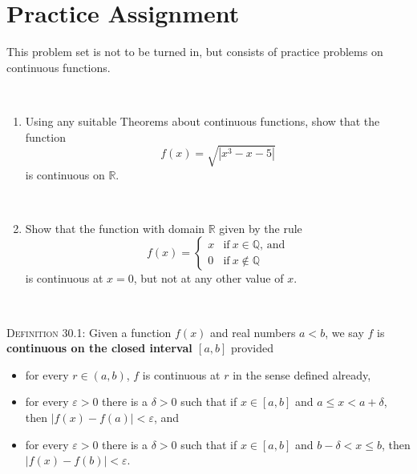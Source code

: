\documentclass[12pt]{amsart}
\newcommand{\Q}{\mathbb{Q}}
\newcommand{\R}{\mathbb{R}}
\newcommand{\e}{\varepsilon}
\newcommand{\showsol}[1]{\def\displaysol{#1}}
\begin{document}
\showsol{1}
	
	\thispagestyle{empty}
	
	\section*{Practice Assignment}
	
	This problem set is not to be turned in, but consists of practice problems on continuous functions.
	
	\
	
	

\begin{enumerate}
\item Using any suitable Theorems about continuous functions, show that the function 
\[\displaystyle f(x)= \sqrt{ | x^3 - x -5 |}\] is continuous on $\R$.

\

\item Show that the function with domain $\R$ given by the rule
\[ f(x) = \begin{cases} x & \text{if} \ x\in \Q, \, \text{and}\\
0 & \text{if} \ x\notin \Q\end{cases}\]
is continuous at $x=0$, but not at any other value of $x$.

\end{enumerate}

\

\begin{framed}
\textsc{Definition 30.1:}  Given a function $f(x)$ and real numbers $a < b$,
we say $f$ is \textbf{continuous on the closed interval $[a,b]$} provided 
\begin{itemize}
\item for every $r \in (a,b)$, $f$ is continuous at $r$ in the sense defined already,
\item for every $\e > 0$ there is a $\delta > 0$ such that if $x \in [a,b]$ and $a \leq x < a+\delta$, then ${|f(x)
  - f(a)| < \e}$, and
\item for every $\e > 0$ there is a $\delta > 0$ such that if $x \in [a,b]$ and $b -\delta < x \leq b$, then ${|f(x)
  - f(b)| < \e}$.
\end{itemize}
\end{framed}

\
\end{document}

